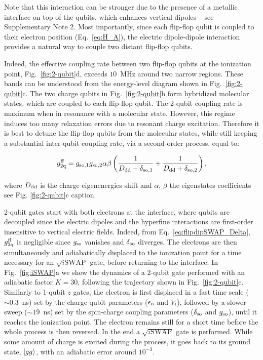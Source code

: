 \documentclass[aps,prb,superscriptaddress,nobibnotes,preprint]{revtex4-1}%
\begin{document}
Note that this interaction can be stronger due to the presence of a metallic interface on top of the qubits, which enhances vertical dipoles -- see Supplementary Note 2. Most importantly, since each flip-flop qubit is coupled to their electron position (Eq.~\ref{eq:H_A}), the electric dipole-dipole interaction provides a natural way to couple two distant flip-flop qubits.

Indeed, the effective coupling rate between two flip-flop qubits at the ionization point, Fig.~\ref{fig:2-qubit}d, exceeds $10$~MHz around two narrow regions. These bands can be understood from the energy-level diagram shown in Fig.~\ref{fig:2-qubit}c. The two charge qubits in Fig.~\ref{fig:2-qubit}b form hybridized molecular states, which are coupled to each flip-flop qubit. The 2-qubit coupling rate is maximum when in resonance with a molecular state. However, this regime induces too many relaxation errors due to resonant charge excitation. Therefore it is best to detune the flip-flop qubits from the molecular states, while still keeping a substantial inter-qubit coupling rate, via a second-order process, equal to:

\begin{equation}\label{eq:flipdipSWAP_Delta}
g_{\rm 2q}^{\rm ff}=g_{\rm so,1}g_{\rm so,2}\alpha\beta\left(\frac{1}{D_{\rm dd}-\delta_{\rm so,1}}+\frac{1}{D_{\rm dd}+\delta_{\rm so,2}}\right),
\end{equation}

where $D_{\rm dd}$ is the charge eigenenergies shift and $\alpha$, $\beta$ the eigenstates coefficients -- see Fig. \ref{fig:2-qubit}c caption.

2-qubit gates start with both electrons at the interface, where qubits are decoupled since the electric dipoles and the hyperfine interactions are first-order insensitive to vertical electric fields. Indeed, from Eq.~\ref{eq:flipdipSWAP_Delta}, $g_{\rm 2q}^{\rm ff}$ is negligible since $g_{\rm so}$ vanishes and $\delta_{\rm so}$ diverges. The electrons are then simultaneously and adiabatically displaced to the ionization point for a time necessary for an $\sqrt{i\mathrm{SWAP}}$ gate, before returning to the interface. In Fig.~\ref{fig:iSWAP}a we show the dynamics of a 2-qubit gate performed with an adiabatic factor $K=30$, following the trajectory shown in Fig.~\ref{fig:2-qubit}e. Similarly to 1-qubit $z$ gates, the electron is first displaced in a fast time scale ($\sim0.3$~ns) set by the charge qubit parameters ($\epsilon_{\rm o}$ and $V_t$), followed by a slower sweep ($\sim19$~ns) set by the spin-charge coupling parameters ($\delta_{\rm so}$ and $g_{\rm so}$), until it reaches the ionization point. The electron remains still for a short time before the whole process is then reversed. In the end a $\sqrt{i\mathrm{SWAP}}$ gate is performed. While some amount of charge is excited during the process, it goes back to its ground state, $\ket{gg}$, with an adiabatic error around $10^{-3}$.
\end{document}
